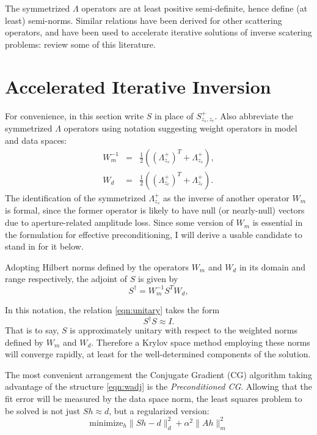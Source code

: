 \documentclass[georeport,12pt]{geophysics}
\begin{document}
The symmetrized $\Lambda$ operators are at least positive
semi-definite, hence define (at least) semi-norms.
Similar relations have been derived for other scattering operators,
and have been used to accelerate iterative solutions of inverse
scatering problems: \cite{DafniSymes:SEG18b} review some of this
literature.

\section{Accelerated Iterative Inversion}

For convenience, in this section write $S$ in place of
$S^+_{z_s,z_r}$. Also abbreviate the symmetrized $\Lambda$ operators
using notation suggesting weight
operators in model and data spaces:
\begin{eqnarray}
  W_m^{-1}&=& \frac{1}{2}((\Lambda^+_{z_s})^T+
              \Lambda^+_{z_s}),\nonumber \\
  W_d &=& \frac{1}{2}((\Lambda^+_{z_r})^T+ \Lambda^+_{z_r}).
          \label{eqn:wdef}
\end{eqnarray}
The identification of the symmetrized $\Lambda^+_{z_s}$ as the inverse
of another operator $W_m$ is formal, since the former operator is
likely to have null (or nearly-null) vectors due to aperture-related
amplitude loss. Since some version of $W_m$ is essential in the
formulation for effective preconditioning, I will derive a usable
candidate to stand in for it below.

Adopting Hilbert norms defined by the operators $W_m$ and $W_d$ in its
domain and range respectively, the adjoint of $S$ is given by
\begin{equation}
\label{eqn:wadj}
S^{\dagger} = W_m^{-1}S^TW_d,
\end{equation}

In this notation, the relation \ref{eqn:unitary} takes the form
\begin{equation}
  \label{eqn:wunitary}
  S^{\dagger}S \approx I.
\end{equation}
That is to say, $S$ is approximately unitary with respect to the
weighted norms defined by $W_m$ and $W_d$. Therefore a Krylov space
method employing these norms will converge rapidly, at least for the
well-determined components of the solution.

The most convenient arrangement the Conjugate Gradient (CG) algorithm
taking advantage of the structure \ref{eqn:wadj} is the {\em
  Preconditioned CG}. Allowing that the fit error will be measured by
the data space norm, the least squares problem to be solved is not
just $Sh \approx d$, but a regularized version:
\begin{equation}
  \label{eqn:einv}
  \mbox{minimize}_h \|Sh-d\|^2_d + \alpha^2 \|Ah\|^2_m
\end{equation}
\end{document}
